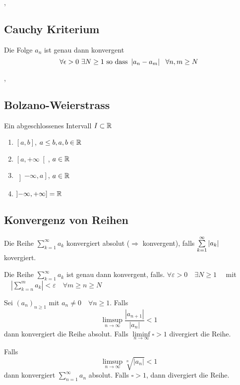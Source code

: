 \sep 

\subsection{Cauchy Kriterium}

 Die Folge $a_{n}$ ist genau dann konvergent
\[
\forall \epsilon > 0 \ \exists N \geq 1 \text{ so dass } \abs{a_{n} - a_{m}} \ \ \forall n, m \geq N
\]

\sep

\subsection{Bolzano-Weierstrass}

\Def[2.5.1] Ein abgeschlossenes Intervall $I \subset \mathbb{R}$ 
\begin{enumerate}
\item[1)] $\left[ a, b \right]$, $a \leq b, a, b \in \mathbb{R}$
\item[2)] $\left[ a, +\infty \right[$, $a \in \mathbb{R}$
\item[3)] $\left] -\infty, a \right]$, $a \in \mathbb{R}$
\item[4)] $\left] -\infty, +\infty \right] = \mathbb{R}$
\end{enumerate}

\subsection{Konvergenz von Reihen}

\Def Die Reihe $\sum_{k=1}^{\infty} a_{k}$ konvergiert absolut ($\Rightarrow$ konvergent), falls $\sum\limits_{k=1}^{\infty} \left\lvert a_{k} \right\rvert$ kovergiert.

\Satz[Cauchy] Die Reihe $\sum_{k=1}^{\infty} a_{k}$ ist genau dann konvergent, falls. $\forall \varepsilon>0 \quad \exists N \geqslant 1 \quad$ mit $\quad\left|\sum\limits_{k=n}^{m} a_{k}\right|<\varepsilon \quad \forall m \geqslant n \geqslant N$

\Satz[Ratio] Sei $\left(a_{n}\right)_{n \geqslant 1}$ mit $a_{n} \neq 0 \quad \forall n \geqslant 1 .$ Falls 
$$\limsup\limits_{n \rightarrow \infty} \frac{\left|a_{n+1}\right|}{\left|a_{n}\right|}<1$$ dann konvergiert die Reihe absolut.
Falls $\liminf\limits_{n \rightarrow \infty}\square > 1$ divergiert die Reihe.

\Satz[Root] Falls $$\limsup\limits_{n \rightarrow \infty} \sqrt[n]{\left|a_{n}\right|}<1$$ dann konvergiert $\sum_{n=1}^{\infty} a_{n}$ absolut. Falls $\square > 1$, dann divergiert die Reihe.

